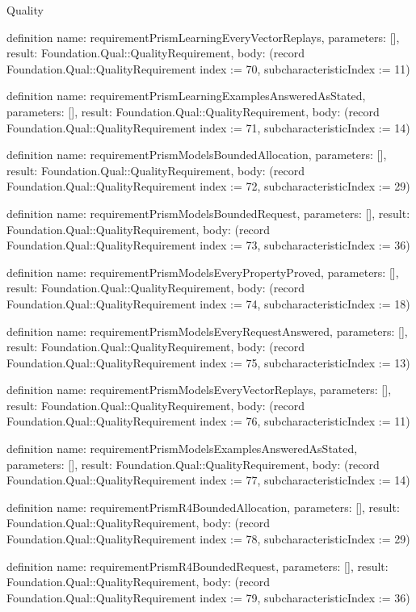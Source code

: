 \begin{lexlean}{Quality}
\begin{semanticmodule}
definition{
  name: requirementPrismLearningEveryVectorReplays,
  parameters: [],
  result: Foundation.Qual::QualityRequirement,
  body: (record Foundation.Qual::QualityRequirement {index := 70, subcharacteristicIndex := 11})
}

definition{
  name: requirementPrismLearningExamplesAnsweredAsStated,
  parameters: [],
  result: Foundation.Qual::QualityRequirement,
  body: (record Foundation.Qual::QualityRequirement {index := 71, subcharacteristicIndex := 14})
}

definition{
  name: requirementPrismModelsBoundedAllocation,
  parameters: [],
  result: Foundation.Qual::QualityRequirement,
  body: (record Foundation.Qual::QualityRequirement {index := 72, subcharacteristicIndex := 29})
}

definition{
  name: requirementPrismModelsBoundedRequest,
  parameters: [],
  result: Foundation.Qual::QualityRequirement,
  body: (record Foundation.Qual::QualityRequirement {index := 73, subcharacteristicIndex := 36})
}

definition{
  name: requirementPrismModelsEveryPropertyProved,
  parameters: [],
  result: Foundation.Qual::QualityRequirement,
  body: (record Foundation.Qual::QualityRequirement {index := 74, subcharacteristicIndex := 18})
}

definition{
  name: requirementPrismModelsEveryRequestAnswered,
  parameters: [],
  result: Foundation.Qual::QualityRequirement,
  body: (record Foundation.Qual::QualityRequirement {index := 75, subcharacteristicIndex := 13})
}

definition{
  name: requirementPrismModelsEveryVectorReplays,
  parameters: [],
  result: Foundation.Qual::QualityRequirement,
  body: (record Foundation.Qual::QualityRequirement {index := 76, subcharacteristicIndex := 11})
}

definition{
  name: requirementPrismModelsExamplesAnsweredAsStated,
  parameters: [],
  result: Foundation.Qual::QualityRequirement,
  body: (record Foundation.Qual::QualityRequirement {index := 77, subcharacteristicIndex := 14})
}

definition{
  name: requirementPrismR4BoundedAllocation,
  parameters: [],
  result: Foundation.Qual::QualityRequirement,
  body: (record Foundation.Qual::QualityRequirement {index := 78, subcharacteristicIndex := 29})
}

definition{
  name: requirementPrismR4BoundedRequest,
  parameters: [],
  result: Foundation.Qual::QualityRequirement,
  body: (record Foundation.Qual::QualityRequirement {index := 79, subcharacteristicIndex := 36})
}


\end{semanticmodule}
\end{lexlean}
